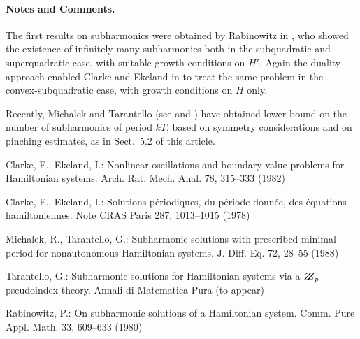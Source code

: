 \documentclass{llncs}
\begin{document}
\paragraph{Notes and Comments.}
The first results on subharmonics were
obtained by Rabinowitz in \cite{rab}, who showed the existence of
infinitely many subharmonics both in the subquadratic and superquadratic
case, with suitable growth conditions on $H'$. Again the duality
approach enabled Clarke and Ekeland in \cite{clar:eke:2} to treat the
same problem in the convex-subquadratic case, with growth conditions on
$H$ only.

Recently, Michalek and Tarantello (see \cite{mich:tar} and \cite{tar})
have obtained lower bound on the number of subharmonics of period $kT$,
based on symmetry considerations and on pinching estimates, as in
Sect.~5.2 of this article.

%
%
\begin{thebibliography}{5}
%
Clarke, F., Ekeland, I.:
Nonlinear oscillations and
boundary-value problems for Hamiltonian systems.
Arch. Rat. Mech. Anal. 78, 315--333 (1982)

Clarke, F., Ekeland, I.:
Solutions p\'{e}riodiques, du
p\'{e}riode donn\'{e}e, des \'{e}quations hamiltoniennes.
Note CRAS Paris 287, 1013--1015 (1978)

Michalek, R., Tarantello, G.:
Subharmonic solutions with prescribed minimal
period for nonautonomous Hamiltonian systems.
J. Diff. Eq. 72, 28--55 (1988)

Tarantello, G.:
Subharmonic solutions for Hamiltonian
systems via a $\bbbz_{p}$ pseudoindex theory.
Annali di Matematica Pura (to appear)

Rabinowitz, P.:
On subharmonic solutions of a Hamiltonian system.
Comm. Pure Appl. Math. 33, 609--633 (1980)

\end{thebibliography}
\end{document}

